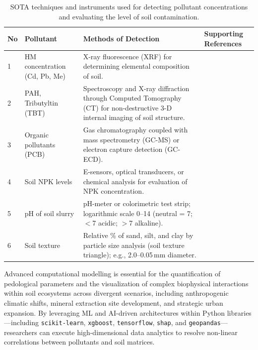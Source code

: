\documentclass[land,article,submit,pdftex,moreauthors]{Definitions/mdpi}
\begin{document}
\begin{table}[H]
\caption{SOTA techniques and instruments used for detecting pollutant
    concentrations and evaluating the level of soil
    contamination.\label{tab1}}
\begin{tabularx}{\textwidth}{@{} p{0.8cm} p{2.2cm} p{5.5cm} X @{}}
\toprule
\textbf{No} & \textbf{Pollutant} & \textbf{Methods of Detection}
    & \textbf{Supporting References} \\
\midrule
1 & HM concentration (Cd, Pb, Me)
    & X-ray fluorescence (XRF) for determining elemental composition of
      soil.
    & \cite{Lu2023,LindhLemenkova2023b,Wan2019,Mukhopadhyay2020,Adewumi2024,Feng2024,Hu2020,Li2019} \\[4pt]
2 & PAH, Tributyltin (TBT)
    & Spectroscopy and X-ray diffraction through Computed Tomography (CT)
      for non-destructive 3-D internal imaging of soil structure.
    & \cite{LindhLemenkova2022d,Deceuster2012,Racic2025,LindhLemenkova2022a,Xu2026,Stojic2019} \\[4pt]
3 & Organic pollutants (PCB)
    & Gas chromatography coupled with mass spectrometry (GC-MS) or
      electron capture detection (GC-ECD).
    & \cite{Bustamante2025,Anagnostou2025,Sandu2025,Shen2024,Appel2022,Arnesdotter2025} \\[4pt]
4 & Soil NPK levels
    & E-sensors, optical transducers, or chemical analysis for evaluation
      of NPK concentration.
    & \cite{Hossain2024,Pal2024,Ma2024,Guan2024,Atoloye2024,Luo2017} \\[4pt]
5 & pH of soil slurry
    & pH-meter or colorimetric test strip; logarithmic scale 0--14
      (neutral = 7; $<$7 acidic; $>$7 alkaline).
    & \cite{Zireeni2023,LindhLemenkova2022b,Rahman2014,Hepperly2009,LindhLemenkova2023c,Guo2021} \\[4pt]
6 & Soil texture
    & Relative \% of sand, silt, and clay by particle size analysis (soil
      texture triangle); e.g., 2.0--0.05\,mm diameter.
    & \cite{Polakowski2023,LindhLemenkova2023d,Mozaffari2026,LindhLemenkova2023a,LindhLemenkova2023e,Jing2023,Wang2022} \\
\bottomrule
\end{tabularx}
\end{table}

Advanced computational modelling is essential for the quantification of
pedological parameters and the visualization of complex biophysical
interactions within soil ecosystems across divergent scenarios, including
anthropogenic climatic shifts, mineral extraction site development, and
strategic urban expansion. By leveraging ML and AI-driven architectures within
Python libraries---including \texttt{scikit-learn}, \texttt{xgboost},
\texttt{tensorflow}, \texttt{shap}, and \texttt{geopandas}---researchers can
execute high-dimensional data analytics to resolve non-linear correlations
between pollutants and soil matrices.
\end{document}
